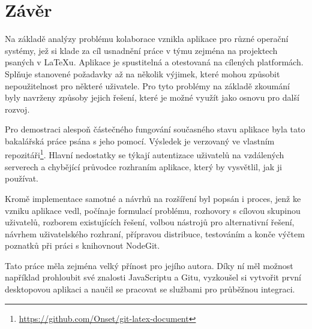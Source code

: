 \chapter{Závěr}

Na základě analýzy problému kolaborace vznikla aplikace pro různé operační systémy, jež si klade za cíl usnadnění práce v týmu zejména na projektech psaných v \LaTeX{u}. Aplikace je spustitelná a otestovaná na cílených platformách. Splňuje stanovené požadavky až na několik výjimek, které mohou způsobit nepoužitelnost pro některé uživatele. Pro tyto problémy na základě zkoumání byly navrženy způsoby jejich řešení, které je možné využít jako osnovu pro další rozvoj.

Pro demostraci alespoň částečného fungování současného stavu aplikace byla tato bakalářská práce psána s jeho pomocí. Výsledek je verzovaný ve vlastním repozitáři\footnote{\url{https://github.com/Onset/git-latex-document}}. Hlavní nedostatky se týkají autentizace uživatelů na vzdálených serverech a chybějící průvodce rozhraním aplikace, který by vysvětlil, jak ji používat.

Kromě implementace samotné a návrhů na rozšíření byl popsán i proces, jenž ke vzniku aplikace vedl, počínaje formulací problému, rozhovory s cílovou skupinou uživatelů, rozborem existujících řešení, volbou nástrojů pro alternativní řešení, návrhem uživatelského rozhraní, přípravou distribuce, testováním a konče výčtem poznatků při práci s knihovnout NodeGit.

Tato práce měla zejména velký přínost pro jejího autora. Díky ní měl možnost například prohloubit své znalosti JavaScriptu a Gitu, vyzkoušel si vytvořit první desktopovou aplikaci a naučil se pracovat se službami pro průběžnou integraci.